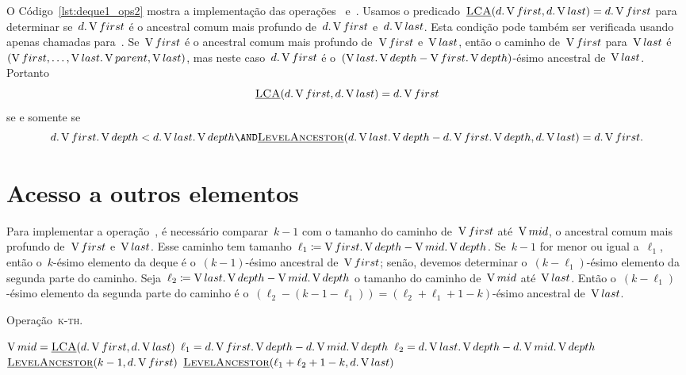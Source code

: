 \documentclass[main.tex]{subfiles}
\begin{document}
O Código~\ref{lst:deque1_ops2} mostra a implementação das operações~ e~. Usamos o predicado~${\mbox{\textsc{\underline{LCA}}\ensuremath{(d.\operatorname{V}{first}, d.\operatorname{V}{last})}} = d.\operatorname{V}{first}}$ para determinar se~$d.\operatorname{V}{first}$ é o ancestral comum mais profundo de~$d.\operatorname{V}{first}$ e~$d.\operatorname{V}{last}$. Esta condição pode também ser verificada usando apenas chamadas para~\mbox{}. Se~$\operatorname{V}{first}$ é o ancestral comum mais profundo de~$\operatorname{V}{first}$ e~$\operatorname{V}{last}$, então o caminho de~$\operatorname{V}{first}$ para~$\operatorname{V}{last}$ é~${(\operatorname{V}{first}, \ldots, \operatorname{V}{last}.\operatorname{V}{parent}, \operatorname{V}{last})}$, mas neste caso~$d.\operatorname{V}{first}$ é o~\mbox{${(\operatorname{V}{last}.\operatorname{V}{depth} - \operatorname{V}{first}.\operatorname{V}{depth})}$-ésimo} ancestral de~$\operatorname{V}{last}$. Portanto $$ \mbox{\textsc{\underline{LCA}}\ensuremath{(d.\operatorname{V}{first}, d.\operatorname{V}{last})}} = d.\operatorname{V}{first} $$ se e somente se $$ d.\V{first}.\V{depth} < d.\V{last}.\V{depth} \AND \funcAPI{LevelAncestor}{d.\V{last}.\V{depth} - d.\V{first}.\V{depth}, d.\V{last}} = d.\V{first}. $$

\section{Acesso a outros elementos}

Para implementar a operação~, é necessário comparar~$k-1$ com o tamanho do caminho de~$\operatorname{V}{first}$ até~$\operatorname{V}{mid}$, o ancestral comum mais profundo de~$\operatorname{V}{first}$ e~$\operatorname{V}{last}$. Esse caminho tem tamanho~${\ell_1 \coloneqq \operatorname{V}{first}.\operatorname{V}{depth} - \operatorname{V}{mid}.\operatorname{V}{depth}}$. Se~$k-1$ for menor ou igual a~$\ell_1$, então o~$k$-ésimo elemento da deque é o~$(k-1)$-ésimo ancestral de~$\operatorname{V}{first}$; senão, devemos determinar o~$(k-\ell_1)$-ésimo elemento da segunda parte do caminho. Seja~${\ell_2 \coloneqq \operatorname{V}{last}.\operatorname{V}{depth} - \operatorname{V}{mid}.\operatorname{V}{depth}}$ o tamanho do caminho de~$\operatorname{V}{mid}$ até~$\operatorname{V}{last}$. Então o~$(k-\ell_1)$-ésimo elemento da segunda parte do caminho é o~$(\ell_2 - (k-1-\ell_1)) = (\ell_2 + \ell_1 + 1 - k)$-ésimo ancestral de~$\operatorname{V}{last}$.

\begin{algorithm}
\caption{Operação~\textsc{k-th}.} \label{lst:deque1_ops3}
\begin{algorithmic}[1]

	\State $\operatorname{V}{mid} = \mbox{\textsc{\underline{LCA}}\ensuremath{(d.\operatorname{V}{first}, d.\operatorname{V}{last})}}$
	\State $\ell_1 = d.\operatorname{V}{first}.\operatorname{V}{depth} - d.\operatorname{V}{mid}.\operatorname{V}{depth}$
	\State $\ell_2 = d.\operatorname{V}{last}.\operatorname{V}{depth} - d.\operatorname{V}{mid}.\operatorname{V}{depth}$
		\State \Return $\mbox{\textsc{\underline{LevelAncestor}}\ensuremath{(k - 1, d.\operatorname{V}{first})}}$
	\Else
		\State \Return $\mbox{\textsc{\underline{LevelAncestor}}\ensuremath{(\ell_1 + \ell_2 + 1 - k, d.\operatorname{V}{last})}}$
	\EndIf
\EndFunction

\end{algorithmic}
\end{algorithm}
\end{document}
